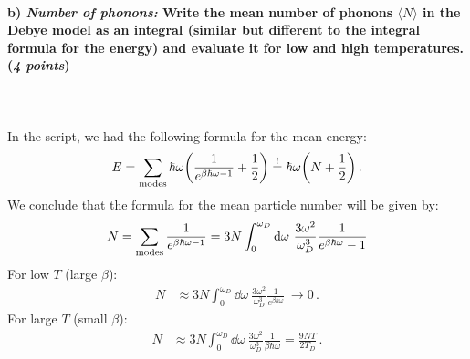\paragraph{b) \textit{Number of phonons:} Write the mean number of phonons 
    $\langle N\rangle$ in the Debye model as an integral (similar but 
    different to the integral formula for the energy) and evaluate it for low 
    and high temperatures. (\textit{4 points})
} \ \\
    \\
    In the script, we had the following formula for the mean energy:
    \begin{align}
        E
        =\sum_\textnormal{modes}\hbar\omega
        \bigg(\frac{1}{e^{\beta\hbar\omega-1}}+\frac{1}{2}\bigg)
        \overset{!}{=}\hbar\omega
        \bigg(N+\frac{1}{2}\bigg) \,.
    \end{align}
    We conclude that the formula for the mean particle number will be given by:
    \begin{align}
        N
        =\sum_\textnormal{modes}
        \frac{1}{e^{\beta\hbar\omega-1}}
        = 3N\int_0^{\omega_D} \dd\omega \ \frac{3\omega^2}{\omega_D^3}\frac{1}{e^{\beta\hbar\omega}-1}
    \end{align}  %
    For low $T$ (large $\beta$):
    \begin{align}
        N
        &\approx 3N\int_0^{\omega_D} \dd\omega \ \frac{3\omega^2}{\omega_D^3}\frac{1}{e^{\beta\hbar\omega}} \ \longrightarrow 0 \,.
    \end{align}
    For large $T$ (small $\beta$):
    \begin{align}
        N
        &\approx 3N\int_0^{\omega_D} \dd\omega \ \frac{3\omega^2}{\omega_D^3}\frac{1}{\beta\hbar\omega} = \frac{9NT}{2T_D} \,.
    \end{align}
